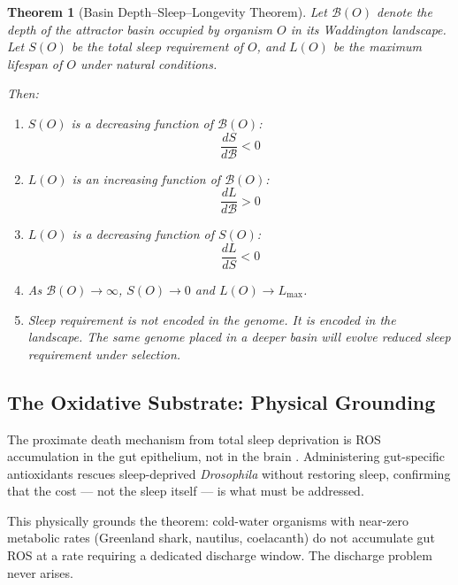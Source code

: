 \documentclass[12pt, a4paper]{article}
\newtheorem{theorem}{Theorem}
\begin{document}
\begin{theorem}[Basin Depth--Sleep--Longevity Theorem]
Let $\mathcal{B}(O)$ denote the depth of the attractor basin
occupied by organism $O$ in its Waddington landscape. Let
$S(O)$ be the total sleep requirement of $O$, and $L(O)$ be
the maximum lifespan of $O$ under natural conditions.

Then:
\begin{enumerate}
    \item $S(O)$ is a decreasing function of $\mathcal{B}(O)$:
    \begin{equation}
        \frac{dS}{d\mathcal{B}} < 0
        \label{eq:sleep_basin}
    \end{equation}
    \item $L(O)$ is an increasing function of $\mathcal{B}(O)$:
    \begin{equation}
        \frac{dL}{d\mathcal{B}} > 0
        \label{eq:lifespan_basin}
    \end{equation}
    \item $L(O)$ is a decreasing function of $S(O)$:
    \begin{equation}
        \frac{dL}{dS} < 0
        \label{eq:lifespan_sleep}
    \end{equation}
    \item As $\mathcal{B}(O) \rightarrow \infty$,
          $S(O) \rightarrow 0$ and
          $L(O) \rightarrow L_{\max}$.
    \item Sleep requirement is not encoded in the genome. It
          is encoded in the landscape. The same genome placed
          in a deeper basin will evolve reduced sleep
          requirement under selection.
\end{enumerate}
\end{theorem}

\subsection{The Oxidative Substrate: Physical Grounding}

The proximate death mechanism from total sleep deprivation
is ROS accumulation in the gut epithelium, not in the
brain \cite{vaccaro2019}. Administering gut-specific
antioxidants rescues sleep-deprived \textit{Drosophila} without
restoring sleep, confirming that the cost --- not the sleep
itself --- is what must be addressed.

This physically grounds the theorem: cold-water organisms
with near-zero metabolic rates (Greenland shark, nautilus,
coelacanth) do not accumulate gut ROS at a rate requiring
a dedicated discharge window. The discharge problem never
arises.
\end{document}
